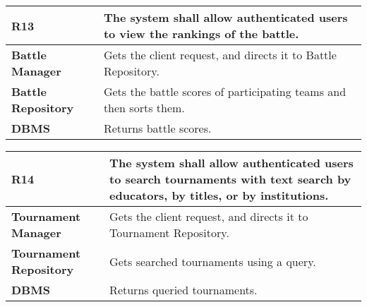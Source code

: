 \begin{table}[h!]
  \centering
  \begin{tabular}{lp{12cm}}
    \hline
    \textbf{R13} & The system shall allow authenticated users to view the rankings of the battle. \\
    \hline
    \hline
    \textbf{Battle Manager} & Gets the client request, and directs it to Battle Repository. \\
    \textbf{Battle Repository} & Gets the battle scores of participating teams and then sorts them.\\
    \textbf{DBMS} & Returns battle scores. \\
    \hline
  \end{tabular}
\end{table}

\begin{table}[h!]
  \centering
  \begin{tabular}{lp{12cm}}
    \hline
    \textbf{R14} & The system shall allow authenticated users to search tournaments with text search by educators, by titles, or by institutions.\\
    \hline
    \hline
    \textbf{Tournament Manager} & Gets the client request, and directs it to Tournament Repository. \\
    \textbf{Tournament Repository} & Gets searched tournaments using a query.\\
    \textbf{DBMS} & Returns queried tournaments. \\
    \hline
  \end{tabular}
\end{table}

